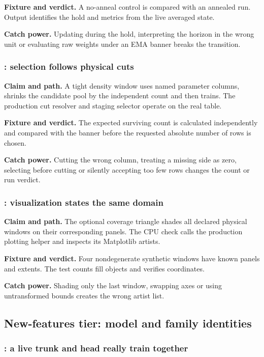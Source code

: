 \textbf{Fixture and verdict.}  A no-anneal control is compared with an
annealed run.  Output identifies the hold and metrics from the live averaged
state.

\textbf{Catch power.}  Updating during the hold, interpreting the horizon in
the wrong unit or evaluating raw weights under an EMA banner breaks the
transition.

\subsubsection{: selection follows physical cuts}

\textbf{Claim and path.}  A tight density window uses named parameter columns,
shrinks the candidate pool by the independent count and then trains.  The
production cut resolver and staging selector operate on the real table.

\textbf{Fixture and verdict.}  The expected surviving count is calculated
independently and compared with the banner before the requested absolute
number of rows is chosen.

\textbf{Catch power.}  Cutting the wrong column, treating a missing side as
zero, selecting before cutting or silently accepting too few rows changes
the count or run verdict.

\subsubsection{: visualization states the same domain}

\textbf{Claim and path.}  The optional coverage triangle shades all declared
physical windows on their corresponding panels.  The CPU check calls the
production plotting helper and inspects its Matplotlib artists.

\textbf{Fixture and verdict.}  Four nondegenerate synthetic windows have known
panels and extents.  The test counts fill objects and verifies coordinates.

\textbf{Catch power.}  Shading only the last window, swapping axes or using
untransformed bounds creates the wrong artist list.

\subsection{New-features tier: model and family identities}

\subsubsection{: a live trunk and head really train together}

